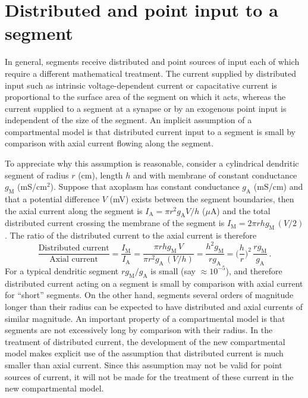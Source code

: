 \section{Distributed and point input to a segment}
In general, segments receive distributed and point sources of
input each of which require a different mathematical treatment.
The current supplied by distributed input such as intrinsic
voltage-dependent current or capacitative current is proportional
to the surface area of the segment on which it acts, whereas the
current supplied to a segment at a synapse or by an exogenous
point input is independent of the size of the segment. An implicit
assumption of a compartmental model is that distributed current
input to a segment is small by comparison with axial current
flowing along the segment.

To appreciate why this assumption is reasonable, consider a
cylindrical dendritic segment of radius $r$ (cm), length $h$ and
with membrane of constant conductance $g_\mathrm{M}$ (mS/cm$^2$).
Suppose that axoplasm has constant conductance $g_\mathrm{A}$
(mS/cm) and that a potential difference $V$ (mV) exists between
the segment boundaries, then the axial current along the segment
is $I_\mathrm{A}=\pi r^2 g_\mathrm{A} V/h$ ($\mu$A) and the total
distributed current crossing the membrane of the segment is
$I_\mathrm{M}=2\pi r h g_\mathrm{M}\,(V/2)$. The ratio of the
distributed current to the axial current is therefore
\begin{equation}\label{pc1}
\frac{\mbox{Distributed current}}{\mbox{Axial current}}
=\frac{I_\mathrm{M}}{I_\mathrm{A}}=\frac{\pi r h g_\mathrm{M}\,V}
{\pi r^2 g_\mathrm{A}\,(V/h)}=\frac{h^2 g_\mathrm{M}} {r
g_\mathrm{A}}=\Big(\frac{h}{r}\Big)^2\, \frac{r
g_\mathrm{M}}{g_\mathrm{A}}\,.
\end{equation}
For a typical dendritic segment $r g_\mathrm{M}/g_\mathrm{A}$ is
small (say $ \approx 10^{-5}$), and therefore distributed current
acting on a segment is small by comparison with axial current for
``short'' segments. On the other hand, segments several orders of
magnitude longer than their radius can be expected to have
distributed and axial currents of similar magnitude. An important
property of a compartmental model is that segments are not
excessively long by comparison with their radius. In the treatment
of distributed current, the development of the new compartmental
model makes explicit use of the assumption that distributed
current is much smaller than axial current. Since this assumption
may not be valid for point sources of current, it will not be made
for the treatment of these current in the new compartmental model.

